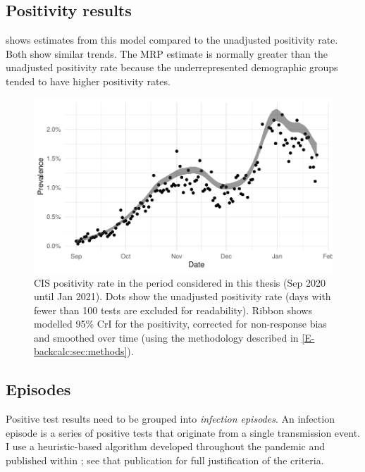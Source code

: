 \documentclass[thesis.tex]{subfiles}
\begin{document}
\subsection{Positivity results} \label{biology-data:sec:positivity-results}

 shows estimates from this model compared to the unadjusted positivity rate.
Both show similar trends.
The MRP estimate is normally greater than the unadjusted positivity rate because the underrepresented demographic groups tended to have higher positivity rates.

\begin{figure}
  \centering \includegraphics[width=\textwidth]{biology-data/CIS-positivity}
  \caption[CIS positivity]{%
    CIS positivity rate in the period considered in this thesis (Sep 2020 until Jan 2021).
    Dots show the unadjusted positivity rate (days with fewer than 100 tests are excluded for readability).
    Ribbon shows modelled 95\% CrI for the positivity, corrected for non-response bias and smoothed over time (using the methodology described in \cref{E-backcalc:sec:methods}).
  }
  \label{biology-data:fig:CIS-positivity}
\end{figure}


\subsection{Episodes} \label{biology-data:sec:cis-episodes}

Positive test results need to be grouped into \emph{infection episodes}.
An infection episode is a series of positive tests that originate from a single transmission event.
I use a heuristic-based algorithm developed throughout the pandemic and published within \textcite{weiRisk}; see that publication for full justification of the criteria.
\end{document}
